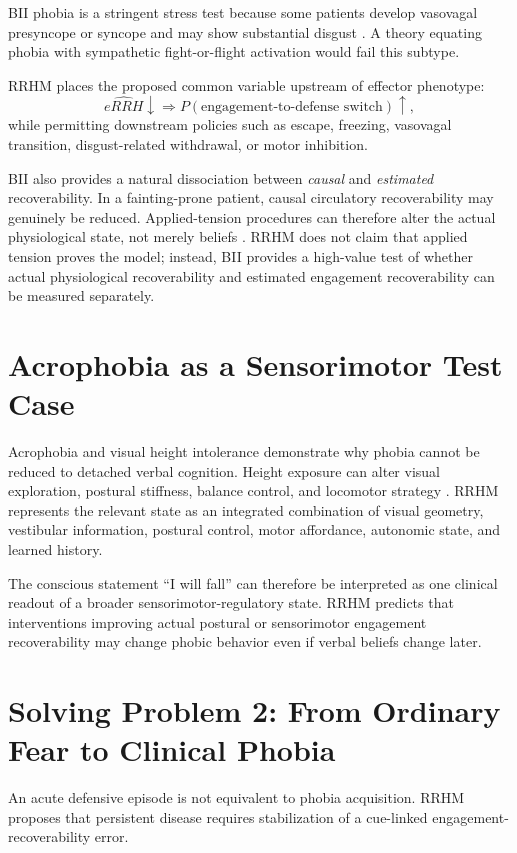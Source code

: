 \documentclass[11pt]{article}
\begin{document}
BII phobia is a stringent stress test because some patients develop vasovagal presyncope or syncope and may show substantial disgust \cite{ayala2009,ritz2010,ducasse2013}. A theory equating phobia with sympathetic fight-or-flight activation would fail this subtype.

RRHM places the proposed common variable upstream of effector phenotype:
\[
\widehat{eRRH}\downarrow
\Rightarrow
P(\text{engagement-to-defense switch})\uparrow,
\]
while permitting downstream policies such as escape, freezing, vasovagal transition, disgust-related withdrawal, or motor inhibition.

BII also provides a natural dissociation between \emph{causal} and \emph{estimated} recoverability. In a fainting-prone patient, causal circulatory recoverability may genuinely be reduced. Applied-tension procedures can therefore alter the actual physiological state, not merely beliefs \cite{ayala2009}. RRHM does not claim that applied tension proves the model; instead, BII provides a high-value test of whether actual physiological recoverability and estimated engagement recoverability can be measured separately.

\section{Acrophobia as a Sensorimotor Test Case}

Acrophobia and visual height intolerance demonstrate why phobia cannot be reduced to detached verbal cognition. Height exposure can alter visual exploration, postural stiffness, balance control, and locomotor strategy \cite{wuehr2015,huppert2020}. RRHM represents the relevant state as an integrated combination of visual geometry, vestibular information, postural control, motor affordance, autonomic state, and learned history.

The conscious statement ``I will fall'' can therefore be interpreted as one clinical readout of a broader sensorimotor-regulatory state. RRHM predicts that interventions improving actual postural or sensorimotor engagement recoverability may change phobic behavior even if verbal beliefs change later.

\section{Solving Problem 2: From Ordinary Fear to Clinical Phobia}

An acute defensive episode is not equivalent to phobia acquisition. RRHM proposes that persistent disease requires stabilization of a cue-linked engagement-recoverability error.
\end{document}
